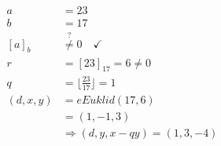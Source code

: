 \documentclass{../crypto}
\begin{document}
\subsection{}

\begin{align*}
  a         &= 23\\
  b         &= 17\\
  [a]_b     &\stackrel{?}{\neq} 0 \quad \checkmark \\
  r         &=                 [23]_{17} = 6 \neq 0 \\
  q         &=                 \lfloor \frac{23}{17} \rfloor = 1\\
  (d, x, y) &=                 \textit{eEuklid}(17, 6) \\
            &=                 (1, -1, 3) \\
            &\Rightarrow       (d, y, x - qy) = (1, 3, -4)
\end{align*}


%
%
%

\subsection{}
\end{document}
